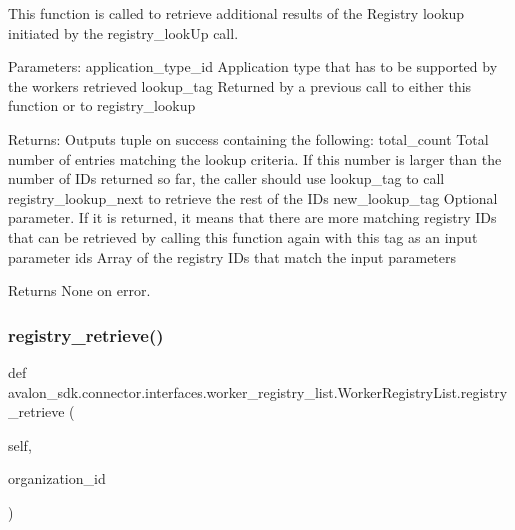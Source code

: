 \begin{DoxyVerb}This function is called to retrieve additional results of the
Registry lookup initiated by the registry_lookUp call.

Parameters:
application_type_id    Application type that has to be
               supported by the workers retrieved
lookup_tag             Returned by a previous call to either this
               function or to registry_lookup

Returns:
Outputs tuple on success containing the following:
total_count    Total number of entries matching the lookup
       criteria. If this number is larger than the number
       of IDs returned so far, the caller should use
       lookup_tag to call registry_lookup_next to
       retrieve the rest of the IDs
new_lookup_tag Optional parameter. If it is returned, it means
       that there are more matching registry IDs that
       can be retrieved by calling this function again
       with this tag as an input parameter
ids            Array of the registry IDs that match the input
       parameters

Returns None on error.
\end{DoxyVerb}
 \mbox{\label{classavalon__sdk_1_1connector_1_1interfaces_1_1worker__registry__list_1_1WorkerRegistryList_ab8b94f02d2de2581f87f60fd3a516dfd}} 
\subsubsection{\texorpdfstring{registry\+\_\+retrieve()}{registry\_retrieve()}}
{\footnotesize\ttfamily def avalon\+\_\+sdk.\+connector.\+interfaces.\+worker\+\_\+registry\+\_\+list.\+Worker\+Registry\+List.\+registry\+\_\+retrieve (\begin{DoxyParamCaption}\item[{}]{self,  }\item[{}]{organization\+\_\+id }\end{DoxyParamCaption})}


